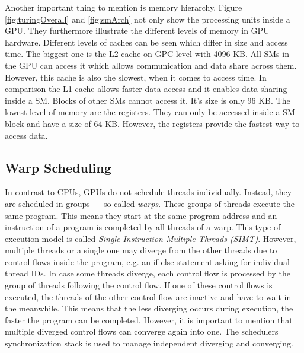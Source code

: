   
 Another important thing to mention is memory hierarchy.
 Figure \ref{fig:turingOverall} and \ref{fig:smArch} not only show the processing units inside a GPU.
 They furthermore illustrate the different levels of memory in GPU hardware.
 Different levels of caches can be seen which differ in size and access time.
 The biggest one is the L2 cache on GPC level with 4096 KB.
 All SMs in the GPU can access it which allows communication and data share across them.
 However, this cache is also the slowest, when it comes to access time.
 In comparison the L1 cache allows faster data access and it enables data sharing inside a SM.
 Blocks of other SMs cannot access it. 
 It's size is only 96 KB.
 The lowest level of memory are the registers.
 They can only be accessed inside a SM block and have a size of 64 KB.
 However, the registers provide the fastest way to access data.~\cite{Huang.2008}~\cite{NVIDIA.2019}
        


\subsection{Warp Scheduling}
\label{subsec:Thr}
  In contrast to CPUs, GPUs do not schedule threads individually.
  Instead, they are scheduled in groups --- so called \textit{warps}.
  These groups of threads execute the same program.
  This means they start at the same program address and an instruction of a program is completed by all threads of a warp.
  This type of execution model is called \textit{Single Instruction Multiple Threads (SIMT)}.
  However, multiple threads or a single one may diverge from the other threads due to control flows inside the program, e.g. an if-else statement asking for individual thread IDs.
  In case some threads diverge, each control flow is processed by the group of threads following the control flow.
  If one of these control flows is executed, the threads of the other control flow are inactive and have to wait in the meanwhile.
  This means that the less diverging occurs during execution, the faster the program can be completed.
  However, it is important to mention that multiple diverged control flows can converge again into one.
  The schedulers synchronization stack is used to manage independent diverging and converging.~\cite{Rauber.2012}~\cite{Lindholm.2008}

